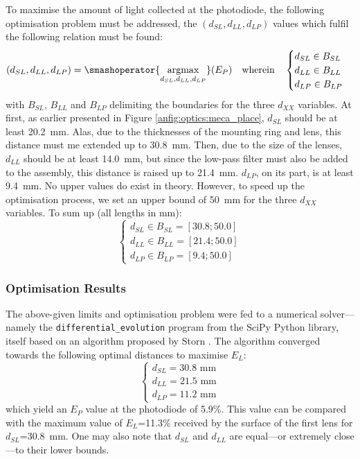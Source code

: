 To maximise the amount of light collected at the photodiode, the following optimisation problem must be addressed, \ie{} the $(d_{SL}, d_{LL},d_{LP})$ values which fulfil the following relation must be found:
\begin{equation}
	\left( d_{SL}, d_{LL},d_{LP} \right) = \smashoperator{\argmax_{d_{SL},d_{LL},d_{LP}}}(E_P)\quad \text{wherein} \quad \begin{cases}
		d_{SL} \in B_{SL}\\
		d_{LL} \in B_{LL}\\
		d_{LP} \in B_{LP}
	\end{cases}
\end{equation}
with $B_{SL}$, $B_{LL}$ and $B_{LP}$ delimiting the boundaries for the three $d_{XX}$ variables. At first, as earlier presented in Figure \ref{anfig:optics:meca_place}, $d_{SL}$ should be at least 20.2~mm. Alas, due to the thicknesses of the mounting ring and lens, this distance must me extended up to 30.8~mm. Then, due to the size of the lenses, $d_{LL}$ should be at least 14.0~mm, but since the low-pass filter must also be added to the assembly, this distance is raised up to 21.4~mm. $d_{LP}$, on its part, is at least 9.4~mm. No upper values do exist in theory. However, to speed up the optimisation process, we set an upper bound of 50~mm for the three $d_{XX}$ variables. To sum up (all lengths in mm):
\begin{equation}
	\begin{cases}
		d_{SL} \in B_{SL}=[30.8;50.0]\\
		d_{LL} \in B_{LL}=[21.4;50.0]\\
		d_{LP} \in B_{LP}=[9.4;50.0]
	\end{cases}
\end{equation}


\subsubsection{Optimisation Results}

The above-given limits and optimisation problem were fed to a numerical solver---namely the \verb|differential_evolution| program from the SciPy Python library\cite{scipy2020}, itself based on an algorithm proposed by Storn \etal{}\cite{storn1997}. The algorithm converged towards the following optimal distances to maximise $E_L$:
\begin{equation}
	\begin{cases}
		d_{SL}=30.8\text{~mm}\\
		d_{LL}=21.5\text{~mm}\\
		d_{LP}=11.2\text{~mm}
	\end{cases}
\end{equation}
which yield an $E_P$ value at the photodiode of 5.9\%. This value can be compared with the maximum value of $E_L$=11.3\% received by the surface of the first lens for $d_{SL}$=30.8~mm. One may also note that $d_{SL}$ and $d_{LL}$ are equal---or extremely close---to their lower bounds.

